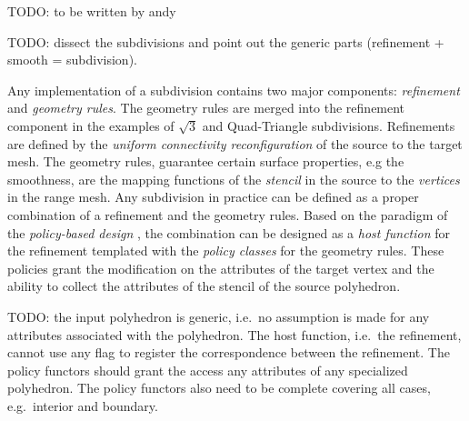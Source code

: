 TODO: to be written by andy

TODO: dissect the subdivisions and point out the generic parts
(refinement + smooth = subdivision).

Any implementation of a subdivision contains two major components:
\emph{refinement} and \emph{geometry rules}.  The geometry rules are
merged into the refinement component in the examples of $\sqrt{3}$ and
Quad-Triangle subdivisions.  Refinements are defined by the
\emph{uniform connectivity reconfiguration} of the source 
to the target mesh. The geometry rules, guarantee certain surface
properties, e.g the smoothness, are the mapping functions of the
\emph{stencil} in the source to the \emph{vertices} in the 
range mesh. Any subdivision in practice can be defined as a proper
combination of a refinement and the geometry rules. Based on the
paradigm of the \emph{policy-based design} \cite{a-rotm-02}, the
combination can be designed as a \emph{host function} for the
refinement templated with the \emph{policy classes} for the geometry
rules.  These policies grant the modification on the attributes of the
target vertex and the ability to collect the attributes of the stencil
of the source polyhedron.

TODO: the input polyhedron is generic, i.e.\ no assumption is made for
any attributes associated with the polyhedron.  The host function,
i.e.\ the refinement, cannot use any flag to register the
correspondence between the refinement.  The policy functors should
grant the access any attributes of any specialized polyhedron. The
policy functors also need to be complete covering all cases, e.g.\
interior and boundary.




